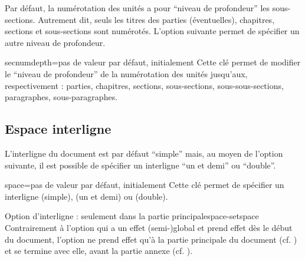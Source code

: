 Par défaut, la numérotation des unités a pour \enquote{niveau de
  profondeur} les sous-sections. Autrement dit, seuls les titres des parties
(éventuelles), chapitres, sections et sous-sections sont numérotés.  L'option
 suivante permet de spécifier un autre niveau de
profondeur.
%
{%
  \begin{docKey}{secnumdepth}{=\textbar{}\textbar{}\textbar{}\textbar{}\textbar{}\textbar{}}{pas
      de valeur par défaut, initialement }
    Cette clé permet de modifier le \enquote{niveau de profondeur} de la
    numérotation des unités jusqu'aux, respectivement : parties,
    chapitres, sections, sous-sections, sous-sous-sections, paragraphes,
    sous-paragraphes.
  \end{docKey}
}

\subsection{Espace interligne}\label{sec-interligne}
%

L'interligne du document est par défaut \enquote{simple} mais, au moyen de
l'option  suivante, il est possible de spécifier un interligne
\enquote{un et demi} ou \enquote{double}.

\begin{docKey}{space}{=\textbar{}\textbar{}}{pas de valeur par défaut,
    initialement }
  Cette clé permet de spécifier un interligne  (simple),
   (un et demi) ou  (double).
\end{docKey}

\begin{dbwarning}{Option d'interligne : seulement dans la partie
    principale}{space-setspace}
  Contrairement à l'option  qui a un effet (semi-)global et
  prend effet dès le début du document, l'option  ne prend effet
  qu'à la partie principale du document (cf. ) et se termine
  avec elle, avant la partie annexe (cf. ).
\end{dbwarning}


